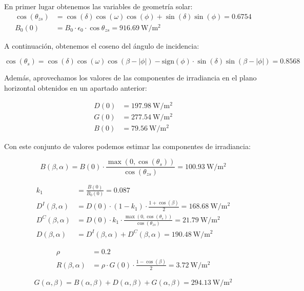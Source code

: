 \begin{itemize}
  En primer lugar obtenemos las variables de geometría solar:
  \begin{align*}
    \cos(\theta_{zs}) &= \cos(\delta) \cos(\omega) \cos(\phi) + \sin(\delta) \sin(\phi) = 0.6754\\
    B_{0}(0) &=B_{0}\cdot\epsilon_{0}\cdot\cos\theta_{zs} = \SI{916.69}{\watt\per\meter\squared}
  \end{align*}

  A continuación, obtenemos el coseno del ángulo de incidencia:

\[
  \cos(\theta_{s}) = \cos(\delta)\cos(\omega)\cos(\beta-|\phi|)-
  \mathrm{sign}(\phi)\cdot\sin(\delta)\sin(\beta-|\phi|) = 0.8568
\]

Además, aprovechamos los valores de las componentes de irradiancia en
el plano horizontal obtenidos en un apartado anterior:

\begin{align*}
  D(0) &= \SI{197.98}{\watt\per\meter\squared}\\
  G(0) &= \SI{277.54}{\watt\per\meter\squared}\\
  B(0) &= \SI{79.56}{\watt\per\meter\squared}
\end{align*}

Con este conjunto de valores podemos estimar las componentes de
irradiancia:

\[
  B(\beta,\alpha) =
  B(0)\cdot\frac{\max(0,\cos(\theta_{s}))}{\cos(\theta_{zs})} =
  \SI{100.93}{\watt\per\meter\squared}
\]

\begin{align*}
  k_{1} &= \frac{B(0)}{B_{0}(0)} = 0.087\\
  D^{I}(\beta,\alpha) &= D(0) \cdot (1-k_{1}) \cdot \frac{1 + \cos(\beta)}{2} = \SI{168.68}{\watt\per\meter\squared}\\
  D^{C}(\beta,\alpha) &= D(0) \cdot k_{1} \cdot \frac{\max(0,\cos(\theta_{s}))}{\cos(\theta_{zs})} = \SI{21.79}{\watt\per\meter\squared}\\
  D(\beta,\alpha) &= D^{I}(\beta,\alpha)+D^{C}(\beta,\alpha) = \SI{190.48}{\watt\per\meter\squared}
\end{align*}

\begin{align*}
  \rho &= 0.2\\
  R(\beta,\alpha) &= \rho\cdot G(0)\cdot\frac{1-\cos(\beta)}{2} = \SI{3.72}{\watt\per\meter\squared}
\end{align*}

\[
  G(\alpha,\beta) = B(\alpha, \beta) + D(\alpha, \beta) + G(\alpha,
  \beta) = \SI{294.13}{\watt\per\meter\squared}
\]
\end{itemize}
